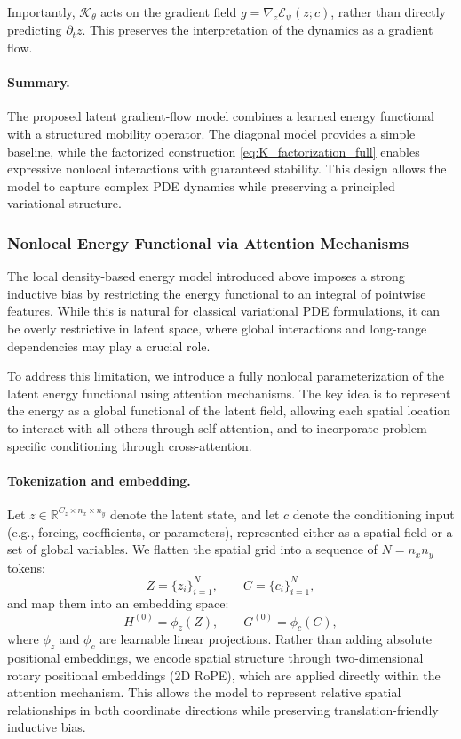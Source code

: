 \documentclass[11pt]{article}
\begin{document}
Importantly, $\mathcal K_\theta$ acts on the gradient field $g=\nabla_z \mathcal E_\psi(z;c)$, rather than directly predicting $\partial_t z$. 
This preserves the interpretation of the dynamics as a gradient flow.


\paragraph{Summary.}
The proposed latent gradient-flow model combines a learned energy functional with a structured mobility operator. 
The diagonal model provides a simple baseline, while the factorized construction \eqref{eq:K_factorization_full} enables expressive nonlocal interactions with guaranteed stability. 
This design allows the model to capture complex PDE dynamics while preserving a principled variational structure.

\subsubsection{Nonlocal Energy Functional via Attention Mechanisms}

The local density-based energy model introduced above imposes a strong inductive bias by restricting the energy functional to an integral of pointwise features. While this is natural for classical variational PDE formulations, it can be overly restrictive in latent space, where global interactions and long-range dependencies may play a crucial role.

To address this limitation, we introduce a fully nonlocal parameterization of the latent energy functional using attention mechanisms. The key idea is to represent the energy as a global functional of the latent field, allowing each spatial location to interact with all others through self-attention, and to incorporate problem-specific conditioning through cross-attention.

\paragraph{Tokenization and embedding.}
Let $z \in \mathbb{R}^{C_z \times n_x \times n_y}$ denote the latent state, and let $c$ denote the conditioning input (e.g., forcing, coefficients, or parameters), represented either as a spatial field or a set of global variables. We flatten the spatial grid into a sequence of $N = n_x n_y$ tokens:
\[
Z = \{z_i\}_{i=1}^N, \qquad C = \{c_i\}_{i=1}^N,
\]
and map them into an embedding space:
\[
H^{(0)} = \phi_z(Z), \qquad G^{(0)} = \phi_c(C),
\]
where $\phi_z$ and $\phi_c$ are learnable linear projections. Rather than adding absolute positional embeddings, we encode spatial structure through two-dimensional rotary positional embeddings (2D RoPE), which are applied directly within the attention mechanism. This allows the model to represent relative spatial relationships in both coordinate directions while preserving translation-friendly inductive bias.
\end{document}
